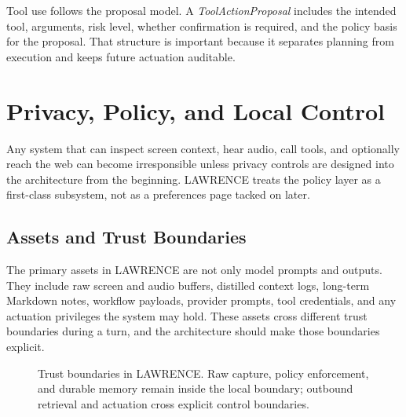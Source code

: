 \documentclass[conference]{IEEEtran}
\begin{document}
Tool use follows the proposal model. A \emph{ToolActionProposal} includes the intended tool, arguments, risk level, whether confirmation is required, and the policy basis for the proposal. That structure is important because it separates planning from execution and keeps future actuation auditable.

\section{Privacy, Policy, and Local Control}
Any system that can inspect screen context, hear audio, call tools, and optionally reach the web can become irresponsible unless privacy controls are designed into the architecture from the beginning. LAWRENCE treats the policy layer as a first-class subsystem, not as a preferences page tacked on later.

\subsection{Assets and Trust Boundaries}
The primary assets in LAWRENCE are not only model prompts and outputs. They include raw screen and audio buffers, distilled context logs, long-term Markdown notes, workflow payloads, provider prompts, tool credentials, and any actuation privileges the system may hold. These assets cross different trust boundaries during a turn, and the architecture should make those boundaries explicit.

\begin{figure}[t]
\centering
{}
\caption{Trust boundaries in LAWRENCE. Raw capture, policy enforcement, and durable memory remain inside the local boundary; outbound retrieval and actuation cross explicit control boundaries.}
\label{fig:trust}
\end{figure}
\end{document}
